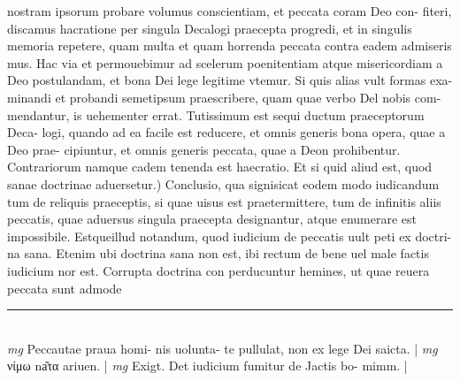 \documentclass{article}
\begin{document}
\begin{pages}
nostram ipsorum probare volumus conscientiam, et peccata coram Deo con- fiteri, discamus hacratione per singula Decalogi praecepta progredi, et in singulis memoria repetere, quam multa et quam horrenda peccata contra eadem admiseris mus. Hac via et permouebimur ad scelerum poenitentiam atque misericordiam a Deo postulandam, et bona Dei lege legitime vtemur. Si quis alias vult formas exa- minandi et probandi semetipsum praescribere, quam quae verbo Del nobis com- mendantur, is uehementer errat. Tutissimum est sequi ductum praeceptorum Deca- logi, quando ad ea facile est reducere, et omnis generis bona opera, quae a Deo prae- cipiuntur, et omnis generis peccata, quae a Deon prohibentur. Contrariorum namque  cadem tenenda est haecratio.  \pend\pstart Et si quid aliud est, quod sanae doctrinae aduersetur.) Conclusio, qua signisicat eodem modo iudicandum tum de reliquis praeceptis, si quae uisus est praetermittere, tum de infinitis aliis peccatis, quae aduersus singula praecepta designantur, atque enumerare est impossibile. Estqueillud notandum, quod iudicium de peccatis uult peti ex doctri- na sana. Etenim ubi doctrina sana non est, ibi rectum de bene uel male factis iudicium nor est. Corrupta doctrina con perducuntur hemines, ut quae reuera peccata sunt admode  \pend\pstart  \pend
\vspace{0.5cm}\noindent
\vspace{0.2cm}\rule{1cm}{0.2pt}\\ 
\hspace{0.2cm}\textit{mg}
\footnotesize Peccautae praua homi- nis uolunta- te pullulat, non ex lege Dei saicta. 
\normalsize| 
\hspace{0.2cm}\textit{mg}
\footnotesize νίμω na͂τα ariuen. 
\normalsize| 
\hspace{0.2cm}\textit{mg}
\footnotesize Exigt. Det iudicium fumitur de Jactis bo- mimm. 
\normalsize| 

\end{pages}
\end{document}
